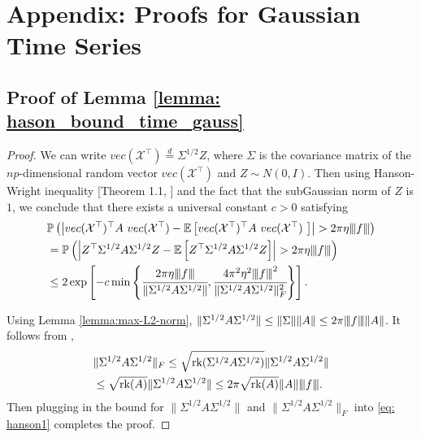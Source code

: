 \section{Appendix: Proofs for Gaussian Time Series}\label{appendix:proof_gaussian}
\subsection{Proof of Lemma \ref{lemma: hason_bound_time_gauss}}
\begin{proof}
We can write $vec(\mathcal{\mathcal{X}}^\top)\stackrel{d}{=}\Sigma^{1/2}Z$, where $\Sigma$ is the covariance matrix of the $np$-dimensional random vector $vec(\mathcal{\mathcal{X}}^\top)$ and $Z\sim N(0,I)$. Then using Hanson-Wright inequality [Theorem 1.1,  \cite{rudelson2013hanson}] and the fact that the subGaussian norm of $Z$ is $1$, we conclude that there exists a universal constant $c>0$ satisfying 
\begin{equation}
\label{eq: hanson1}
\begin{aligned}
&\mathbb{P}\left(\left|vec(\mathcal{\mathcal{X}}^\top)^\top A ~vec(\mathcal{\mathcal{X}}^\top) - \mathbb{E} \left[vec(\mathcal{\mathcal{X}}^\top)^\top A~ vec(\mathcal{\mathcal{X}}^\top)~\right]\right| >2\pi\eta\vertiii{f}\right) \\
&= \mathbb{P}\left(\left|Z^\top \Sigma^{1/2}A\Sigma^{1/2}Z - \mathbb{E}\left[ Z^\top \Sigma^{1/2}A\Sigma^{1/2}Z \right]\right|>2\pi \eta\vertiii{f}\right)\\
&\le 2\exp\left[-c\min\left\{\cfrac{2\pi \eta\vertiii{f}}{\|\Sigma^{1/2}A\Sigma^{1/2}\|},\cfrac{4\pi^2\eta^2\vertiii{f}^2}{\|\Sigma^{1/2}A\Sigma^{1/2}\|_F^2}\right\}\right].
\end{aligned}
\end{equation}




Using Lemma \ref{lemma:max-L2-norm}, $\|\Sigma^{1/2}A\Sigma^{1/2}\|\le \|\Sigma\|\|A\|\le 2\pi {\left\vert\kern-0.25ex\left\vert\kern-0.25ex\left\vert f \right\vert\kern-0.25ex\right\vert\kern-0.25ex\right\vert} \|A\|$. It follows from \citet{golub2012matrix},
\begin{equation}
\begin{aligned}
&\|\Sigma^{1/2}A\Sigma^{1/2}\|_F \le \sqrt{\mbox{rk}(\Sigma^{1/2}A\Sigma^{1/2})} \|\Sigma^{1/2}A\Sigma^{1/2}\| \nonumber \\
&\le \sqrt{\mbox{rk}(A)} \|\Sigma^{1/2}A\Sigma^{1/2}\| \le 2\pi \sqrt{\mbox{rk}(A)} \|A\| {\left\vert\kern-0.25ex\left\vert\kern-0.25ex\left\vert f \right\vert\kern-0.25ex\right\vert\kern-0.25ex\right\vert}. \nonumber
\end{aligned}
\end{equation}
Then plugging in the bound for $\|\Sigma^{1/2}A\Sigma^{1/2}\|$ and 
$\|\Sigma^{1/2}A\Sigma^{1/2}\|_F$ into \eqref{eq: hanson1} completes the proof.
\end{proof}

